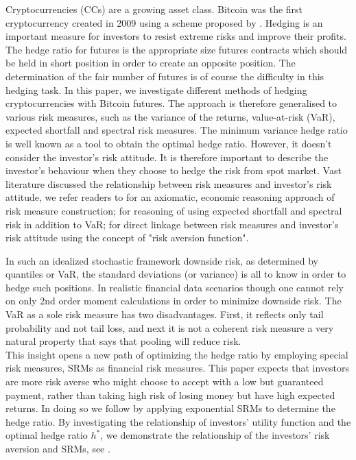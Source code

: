 \documentclass[11pt,a4paper,english]{article}
\begin{document}
Cryptocurrencies (CCs) are a growing asset class.
Bitcoin was the first cryptocurrency created in 2009 using a scheme proposed by \citet{nakamoto2019bitcoin}.
Hedging is an important measure for investors to resist extreme risks and improve their profits.
The hedge ratio for futures is the appropriate size futures contracts which should be held in short position
in order to create an opposite position.
The determination of the fair number of futures is of course the difficulty in this hedging task.
In this paper, we investigate different methods of hedging cryptocurrencies with Bitcoin futures.
The approach is therefore generalised to various risk measures, such as the variance of the returns,
value-at-risk (VaR), expected shortfall and spectral risk measures.
The minimum variance hedge ratio is well known as a tool to obtain the optimal hedge ratio.
However, it doesn't consider the investor's risk attitude.
It is therefore important to describe the investor's behaviour when they choose to hedge the risk from spot market.
Vast literature discussed the relationship between risk measures and investor's risk attitude, we refer readers to
\citet{artzner1999coherent} for an axiomatic, economic reasoning approach of risk measure construction;
\citet{embrechts2002correlation} for reasoning of using expected shortfall and spectral risk in addition to VaR;
\citet{Acerbi2002} for direct linkage between risk measures and investor's risk attitude using the concept of "risk aversion function".

In such an idealized stochastic framework downside risk, as determined by quantiles or VaR,
the standard deviations (or variance) is all to know in order to hedge such positions.
In realistic financial data scenarios though one cannot rely on only 2nd order moment calculations in order to minimize downside risk.
The VaR as a sole risk measure has two disadvantages.
First, it reflects only tail probability and not tail loss, and next it is not a coherent risk measure a very natural property that says that pooling will reduce risk. \\

This insight opens a new path of optimizing the hedge ratio by employing special risk measures, SRMs as financial risk measures.
This paper expects that investors are more risk averse who might choose to accept with a low but guaranteed payment,
rather than taking high risk of losing money but have high expected returns.
In doing so we follow \citet{barbi2014copula} by applying exponential SRMs to determine the hedge ratio.
By investigating the relationship of investors' utility function and the optimal hedge ratio $h^\ast$, we demonstrate the relationship of the investors' risk aversion and SRMs, see \citet{brandtner2015decision}.\\
\end{document}
